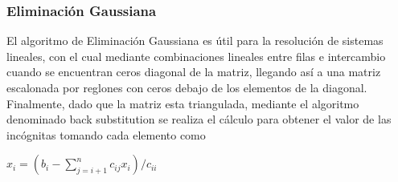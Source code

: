 \subsubsection{Eliminación Gaussiana}

El algoritmo de Eliminación Gaussiana es útil para la resolución de sistemas lineales, con el cual mediante combinaciones lineales entre filas e intercambio cuando se encuentran ceros diagonal de la matriz, llegando así a una matriz escalonada por reglones con ceros debajo de los elementos de la diagonal.\\
Finalmente, dado que la matriz esta triangulada, mediante el algoritmo denominado back substitution se realiza el cálculo para obtener el valor de las incógnitas tomando cada elemento como\\

\begin{center}
$x_i = (b_i - \sum\limits_{j = i + 1}^n c_{ij}x_i) / c_{ii}$ \\
\end{center}

